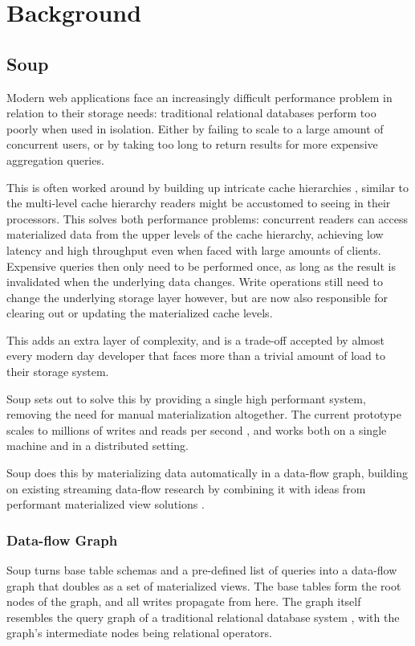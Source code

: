 \documentclass[b5paper]{report}
\begin{document}
\chapter{Background}
\section{Soup}
Modern web applications face an increasingly difficult performance problem in
relation to their storage needs: traditional relational databases perform too
poorly when used in isolation. Either by failing to scale to a large amount of
concurrent users, or by taking too long to return results for more expensive
aggregation queries.

This is often worked around by building up intricate cache hierarchies
\cite{memcached}, similar to the multi-level cache hierarchy readers might be
accustomed to seeing in their processors. This solves both performance problems:
concurrent readers can access materialized data from the upper levels of the
cache hierarchy, achieving low latency and high throughput even when faced with
large amounts of clients. Expensive queries then only need to be performed once,
as long as the result is invalidated when the underlying data changes. Write
operations still need to change the underlying storage layer however, but are
now also responsible for clearing out or updating the materialized cache levels.

This adds an extra layer of complexity, and is a trade-off accepted by almost
every modern day developer that faces more than a trivial amount of load to
their storage system.

Soup sets out to solve this by providing a single high performant system,
removing the need for manual materialization altogether. The current prototype
scales to millions of writes and reads per second \cite{soup}, and works both on
a single machine and in a distributed setting.

Soup does this by materializing data automatically in a data-flow
graph, building on existing streaming data-flow research \cite{naiad, dataflow}
by combining it with ideas from performant materialized view solutions
\cite{dbtoaster, pequod}.

\subsection{Data-flow Graph}
Soup turns base table schemas and a pre-defined list of queries into a data-flow
graph that doubles as a set of materialized views. The base tables form the
root nodes of the graph, and all writes propagate from here. The graph itself
resembles the query graph of a traditional relational database system
\cite{codd}, with the graph's intermediate nodes being relational operators.
\end{document}
